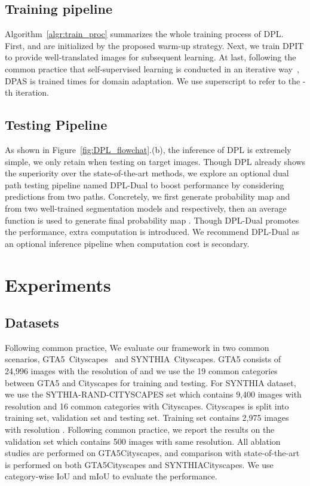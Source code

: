\documentclass[10pt,twocolumn,letterpaper]{article}
\begin{document}
\subsection{Training pipeline}
\label{section:trainpipeline}
Algorithm~\ref{algr:train_proc} summarizes the whole training process of DPL. First,  and  are initialized by the proposed warm-up strategy. Next, we train DPIT to provide well-translated images for subsequent learning. At last, following the common practice that self-supervised learning is conducted in an iterative way~\cite{li2019bidirectional,zou2019confidence,Two-phase}, DPAS is trained  times for domain adaptation. We use superscript  to refer to the -th iteration.
 

\subsection{Testing Pipeline}
\label{section:testpipeline}
As shown in Figure~\ref{fig:DPL_flowchat}.(b), the inference of DPL is extremely simple, we only retain  when testing on target images. Though DPL already shows the superiority over the state-of-the-art methods, we explore an optional dual path testing pipeline named DPL-Dual to boost performance by considering predictions from two paths. Concretely, we first generate probability map  and  from two well-trained segmentation models  and  respectively, then an average function is used to generate final probability map . Though DPL-Dual promotes the performance, extra computation is introduced. We recommend DPL-Dual as an optional inference pipeline when computation cost is secondary.

\section{Experiments}
\label{section:exp}
\subsection{Datasets}
Following common practice, We evaluate our framework in two common scenarios, GTA5~\cite{richter2016playing}Cityscapes~\cite{cordts2016cityscapes} and SYNTHIA~\cite{ros2016synthia}Cityscapes. GTA5 consists of 24,996 images with the resolution of  and we use the 19 common categories between GTA5 and Cityscapes for training and testing. For SYNTHIA dataset, we use the SYTHIA-RAND-CITYSCAPES set which contains 9,400 images with resolution  and 16 common categories with Cityscapes. Cityscapes is split into training set, validation set and testing set. Training set contains 2,975 images with resolution . Following common practice, we report the results on the validation set which contains 500 images with same resolution. All ablation studies are performed on GTA5Cityscapes, and comparison with state-of-the-art is performed on both GTA5Cityscapes and SYNTHIACityscapes. We use category-wise IoU and mIoU to evaluate the performance.
\end{document}

